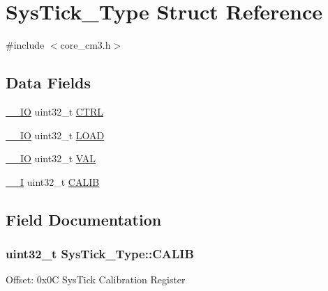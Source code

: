 \hypertarget{structSysTick__Type}{}\section{Sys\+Tick\+\_\+\+Type Struct Reference}
\label{structSysTick__Type}


{\ttfamily \#include $<$core\+\_\+cm3.\+h$>$}

\subsection*{Data Fields}
\begin{DoxyCompactItemize}
\item 
\hyperlink{LPC17xx_8h_aec43007d9998a0a0e01faede4133d6be}{\+\_\+\+\_\+\+IO} uint32\+\_\+t \hyperlink{structSysTick__Type_af2ad94ac83e5d40fc6e34884bc1bec5f}{C\+T\+RL}
\item 
\hyperlink{LPC17xx_8h_aec43007d9998a0a0e01faede4133d6be}{\+\_\+\+\_\+\+IO} uint32\+\_\+t \hyperlink{structSysTick__Type_ae7bc9d3eac1147f3bba8d73a8395644f}{L\+O\+AD}
\item 
\hyperlink{LPC17xx_8h_aec43007d9998a0a0e01faede4133d6be}{\+\_\+\+\_\+\+IO} uint32\+\_\+t \hyperlink{structSysTick__Type_a0997ff20f11817f8246e8f0edac6f4e4}{V\+AL}
\item 
\hyperlink{LPC17xx_8h_af63697ed9952cc71e1225efe205f6cd3}{\+\_\+\+\_\+I} uint32\+\_\+t \hyperlink{structSysTick__Type_a9c9eda0ea6f6a7c904d2d75a6963e238}{C\+A\+L\+IB}
\end{DoxyCompactItemize}


\subsection{Field Documentation}
\subsubsection[{\texorpdfstring{C\+A\+L\+IB}{CALIB}}]{ uint32\+\_\+t Sys\+Tick\+\_\+\+Type\+::\+C\+A\+L\+IB}\hypertarget{structSysTick__Type_a9c9eda0ea6f6a7c904d2d75a6963e238}{}\label{structSysTick__Type_a9c9eda0ea6f6a7c904d2d75a6963e238}
Offset\+: 0x0C Sys\+Tick Calibration Register 
